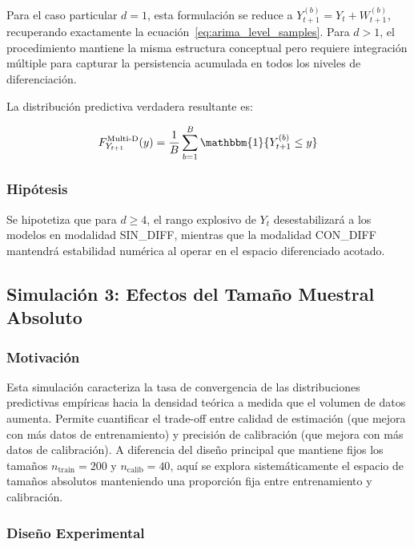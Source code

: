 Para el caso particular $d=1$, esta formulación se reduce a $Y_{t+1}^{(b)} = Y_t + W_{t+1}^{(b)}$, recuperando exactamente la ecuación~\eqref{eq:arima_level_samples}. Para $d > 1$, el procedimiento mantiene la misma estructura conceptual pero requiere integración múltiple para capturar la persistencia acumulada en todos los niveles de diferenciación.

La distribución predictiva verdadera resultante es:

\begin{equation}
F_{Y_{t+1}}^{\text{Multi-D}}(y) = \frac{1}{B} \sum_{b=1}^B \mathbbm{1}\{Y_{t+1}^{(b)} \leq y\}
\label{eq:multid_true_cdf}
\end{equation}


\subsubsection{Hipótesis}

Se hipotetiza que para $d \geq 4$, el rango explosivo de $Y_t$ desestabilizará a los modelos en modalidad SIN\_DIFF, mientras que la modalidad CON\_DIFF mantendrá estabilidad numérica al operar en el espacio diferenciado acotado.



\subsection{Simulación 3: Efectos del Tamaño Muestral Absoluto}
\label{subsec:sim3_tamano_muestral}

\subsubsection{Motivación}

Esta simulación caracteriza la tasa de convergencia de las distribuciones predictivas empíricas hacia la densidad teórica a medida que el volumen de datos aumenta. Permite cuantificar el trade-off entre calidad de estimación (que mejora con más datos de entrenamiento) y precisión de calibración (que mejora con más datos de calibración). A diferencia del diseño principal que mantiene fijos los tamaños $n_{\text{train}} = 200$ y $n_{\text{calib}} = 40$, aquí se explora sistemáticamente el espacio de tamaños absolutos manteniendo una proporción fija entre entrenamiento y calibración.

\subsubsection{Diseño Experimental}

